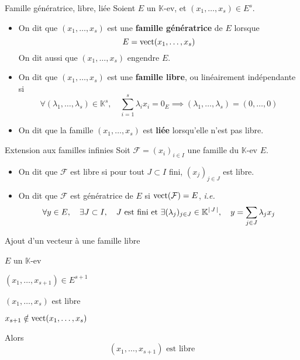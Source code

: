     \begin{defi}{Famille génératrice, libre, liée}{}
        Soient $E$ un $\mathbb{K}$-ev, et $(x_1,\ldots,x_s) \in E^s$.

        \begin{itemize}
            \item On dit que $(x_1,\ldots,x_s)$ est une \textbf{famille génératrice} de $E$ lorsque 
        \[ E = \operatorname{vect}(x_1,\ldots,x_s) \] 
        On dit aussi que $(x_1,\ldots,x_s)$ engendre $E$.
            \item On dit que $(x_1,\ldots,x_s)$ est une \textbf{famille libre}, ou linéairement indépendante si 
            \[ \forall (\lambda_1,\ldots,\lambda_s) \in \mathbb{K}^s, \quad \sum\limits_{i=1}^s \lambda_i x_i = 0_E \implies (\lambda_1,\ldots,\lambda_s) = (0,\ldots,0) \]
            \item On dit que la famille $(x_1,\ldots,x_s)$ est \textbf{liée} lorsqu’elle n’est pas libre.
        \end{itemize}
    \end{defi}

    \begin{defi}{Extension aux familles infinies}{}
        Soit $\mathcal{F} = (x_i)_{i \in I}$ une famille du $\mathbb{K}$-ev $E$.
        \begin{itemize}
            \item On dit que $\mathcal{F}$ est libre si pour tout $J \subset I$ fini, $(x_j)_{j \in J}$ est libre.
            \item On dit que $\mathcal{F}$ est génératrice de $E$ si $\operatorname{vect}(\mathcal{F}) = E$, \textit{i.e.}
            \[ \forall y \in E, \quad \exists J \subset I, \quad J \text{ est fini et } \exists (\lambda_j)_{j \in J} \in \mathbb{K}^{\left\lvert \,J \, \right\rvert}, \quad y = \sum_{j \in J} \lambda_j x_j \]
        \end{itemize}
    \end{defi}

    \begin{prop}{Ajout d’un vecteur à une famille libre}{}
        \begin{soient}
            \item $E$ un $\mathbb{K}$-ev
            \item $(x_1,\ldots,x_{s+1}) \in E^{s+1}$
        \end{soient}
        \begin{suppose}
            \item $(x_1,\ldots,x_s)$ est libre
            \item $x_{s+1} \notin \operatorname{vect}(x_1,\ldots,x_{s})$
        \end{suppose}
        Alors \[ (x_1,\ldots,x_{s+1}) \text{ est libre} \]
    \end{prop}

